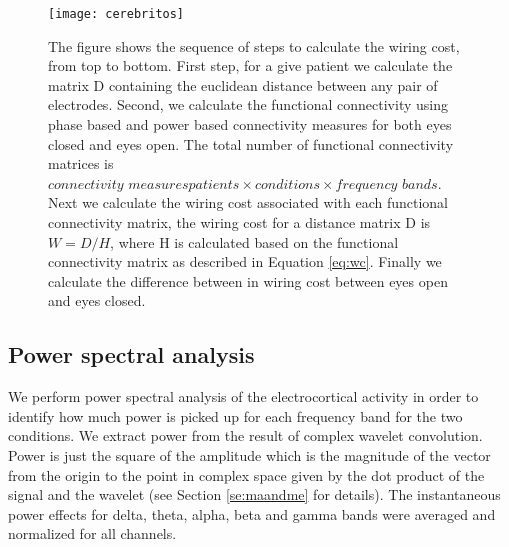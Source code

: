 \documentclass[11pt, onecolumn]{article}
\begin{document}
\begin{figure}[ht] 
  \centering
  \texttt{[image: cerebritos]} 
  \caption{The figure shows the sequence of steps to calculate the wiring cost, from top to bottom. First step, for a give patient we calculate the matrix D containing the euclidean distance between any pair of electrodes. Second, we calculate the functional connectivity using phase based and power based connectivity measures for both eyes closed and eyes open. The total number of functional connectivity matrices is $\textit{connectivity measures} \textit{patients} \times \textit{conditions} \times \textit{frequency bands}$. Next we calculate the wiring cost associated with each functional connectivity matrix, the wiring cost for a distance matrix D is $W = D/ H$, where H is calculated based on the functional connectivity matrix as described in Equation \ref{eq:wc}. Finally we calculate the difference between in wiring cost between eyes open and eyes closed.}
  \label{fig:cerebritos} 
\end{figure}
\subsection{Power spectral analysis}
We perform power spectral analysis of the electrocortical activity in order to identify how much power is picked up for each frequency band for the two conditions.
We extract power from the result of complex wavelet convolution. Power is just the square of the amplitude which is the magnitude of the vector from the origin to the point in complex space given by the dot product of the signal and the wavelet (see Section \ref{se:maandme} for details). 
The instantaneous power effects for delta, theta, alpha, beta and gamma bands were averaged and normalized for all channels. 
\end{document}
